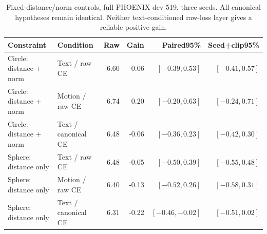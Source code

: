 \begin{table}[t]
\centering\small
\caption{Fixed-distance/norm controls, full PHOENIX dev 519, three seeds. All canonical hypotheses remain identical. Neither text-conditioned raw-loss layer gives a reliable positive gain.}
\label{tab:constrained}
\begin{tabular}{llrrrr}\toprule
Constraint&Condition&Raw&Gain&Paired95\%&Seed+clip95\%\\\midrule
Circle: distance + norm&Text / raw CE&6.60&0.06&$[-0.39,0.53]$&$[-0.41,0.57]$\\
Circle: distance + norm&Motion / raw CE&6.74&0.20&$[-0.20,0.63]$&$[-0.24,0.71]$\\
Circle: distance + norm&Text / canonical CE&6.48&-0.06&$[-0.36,0.23]$&$[-0.42,0.30]$\\
Sphere: distance only&Text / raw CE&6.48&-0.05&$[-0.50,0.39]$&$[-0.55,0.48]$\\
Sphere: distance only&Motion / raw CE&6.40&-0.13&$[-0.52,0.26]$&$[-0.58,0.31]$\\
Sphere: distance only&Text / canonical CE&6.31&-0.22&$[-0.46,-0.02]$&$[-0.51,0.02]$\\
\bottomrule\end{tabular}\end{table}

